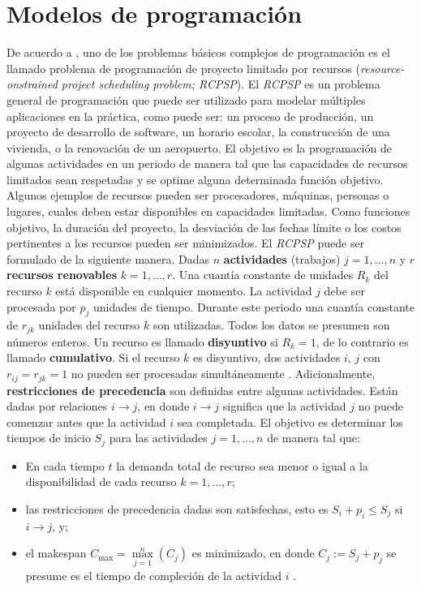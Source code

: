 \documentclass[spanish,draft,12pt,headsepline,footsepline,paper=letter]{scrreprt}
\begin{document}
\section{Modelos de programación}

De acuerdo a \citet[p.~2]{Robert2010}, uno de los problemas básicos complejos de programación es el llamado problema de programación de proyecto limitado por recursos (\textit{resource-onstrained project scheduling problem; RCPSP}). El \textit{RCPSP} es un problema general de programación que puede ser utilizado para modelar múltiples aplicaciones en la práctica, como puede ser: un proceso de producción, un proyecto de desarrollo de software, un horario escolar, la construcción de una vivienda, o la renovación de un aeropuerto. El objetivo es la programación de algunas actividades en un periodo de manera tal que las capacidades de recursos limitados sean respetadas y se optime alguna determinada función objetivo. Algunos ejemplos de recursos pueden ser procesadores, máquinas, personas o lugares, cuales deben estar disponibles en capacidades limitadas. Como funciones objetivo, la duración del proyecto, la desviación de las fechas límite o los costos pertinentes a los recursos pueden ser minimizados.
El \textit{RCPSP} puede ser formulado de la siguiente manera. Dadas $n$ \textbf{actividades} (trabajos) $j=1,\dots,n$ y $r$ \textbf{recursos renovables} $k=1,\dots,r$. Una cuantía constante de unidades $R_k$ del recurso $k$ está disponible en cualquier momento. La actividad $j$ debe ser procesada por $p_j$ unidades de tiempo. Durante este periodo una cuantía constante de $r_{jk}$ unidades del recurso $k$ son utilizadas. Todos los datos se presumen son números enteros. Un recurso es llamado \textbf{disyuntivo} si $R_k=1$, de lo contrario es llamado \textbf{cumulativo}. Si el recurso $k$ es disyuntivo, dos actividades $i$, $j$ con $r_{ij}=r_{jk}=1$ no pueden ser procesadas simultáneamente \citep[p.~2]{Robert2010}.
Adicionalmente, \textbf{restricciones de precedencia} son definidas entre algunas actividades. Están dadas por relaciones $i \to j$, en donde $i \to j$ significa que la actividad $j$ no puede comenzar antes que la actividad $i$ sea completada. El objetivo es determinar los tiempos de inicio $S_j$ para las actividades $j=1,\dots,n$ de manera tal que:

\begin{itemize}
  \item En cada tiempo $t$ la demanda total de recurso sea menor o igual a la disponibilidad de cada recurso $k=1,\dots,r$;
  \item las restricciones de precedencia dadas son satisfechas, esto es $S_i+p_i \leq S_j$ si $i \to j$, y;
  \item el makespan $C_{\max}=\overset{n}{\underset{j=1}{\max}}(C_j)$ es minimizado, en donde $C_j:=S_j+p_j$ se presume es el tiempo de compleción de la actividad $i$ \citep[p.~2]{Robert2010}.
  \end{itemize}
\end{document}
